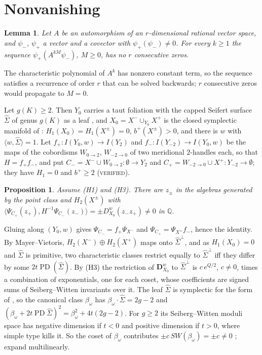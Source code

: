 \documentclass[10pt]{amsart}
\makeatletter
\numberwithin{equation}{section}
\theoremstyle{compact}
\newtheorem{proposition}[theorem]{Proposition}
\newtheorem{lemma}[theorem]{Lemma}
\renewenvironment{proof}[1][\proofname]{\par\pushQED{\qed}\normalfont
  \topsep4\p@\relax\trivlist\item[\hskip\labelsep\itshape#1\@addpunct{.}]%
  \ignorespaces}{\popQED\endtrivlist\@endpefalse}
\newcommand{\Q}{\mathbb Q}
\newcommand{\PD}{\operatorname{PD}}
\newcommand{\hS}{\hat\Sigma}
\newcommand{\ver}{\textsc{verified}}
\makeatother
\begin{document}
\section{Nonvanishing}

\begin{lemma}\label{lem:CH}
Let $A$ be an automorphism of an $r$-dimensional rational vector space, and
$\psi_-$, $\psi_+$ a vector and a covector with $\psi_+(\psi_-)\ne0$. For every
$k\ge1$ the sequence $\psi_+(A^{kM}\psi_-)$, $M\ge0$, has no $r$ consecutive
zeros.
\end{lemma}

\begin{proof}
The characteristic polynomial of $A^k$ has nonzero constant term, so the
sequence satisfies a recurrence of order $r$ that can be solved backwards; $r$
consecutive zeros would propagate to $M=0$.
\end{proof}

Let $g(K)\ge2$. Then $Y_0$ carries a taut foliation with the capped Seifert
surface $\hS$ of genus $g(K)$ as a leaf \cite{Ga}, and $X_0=X^-\cup_{Y_0}X^+$ is the closed
symplectic manifold of \cite[Prop.~15]{KM04}: $H_1(X_0)=H_1(X^\pm)=0$,
$b^+(X^\pm)>0$, and there is $w$ with $\langle w,\hS\rangle=1$. Let
$f_+\colon I(Y_0,w)\to I(Y_2)$ and $f_-\colon I(Y_{-2})\to I(Y_0,w)$ be the maps
of the cobordisms $W_{0\to2}$, $W_{-2\to0}$ of two meridional $2$-handles each,
so that $H=f_+f_-$, and put $C_-=X^-\cup W_{0\to2}\colon\emptyset\to Y_2$ and
$C_+=W_{-2\to0}\cup X^+\colon Y_{-2}\to\emptyset$; they have $H_1=0$ and
$b^+\ge2$ (\ver).

\begin{proposition}\label{prop:caps}
Assume \textup{(H1)} and \textup{(H3)}. There are $z_\pm$ in the algebras
generated by the point class and $H_2(X^\pm)$ with
$\langle\Psi_{C_+}(z_+),H^{-1}\Psi_{C_-}(z_-)\rangle=\pm D^w_{X_0}(z_-z_+)\ne0$ in
$\Q$.
\end{proposition}

\begin{proof}
Gluing along $(Y_0,w)$ gives $\Psi_{C_-}=f_+\Psi_{X^-}$ and
$\Psi_{C_+}=\Psi_{X^+}f_-$, hence the identity. By Mayer--Vietoris, $H_2(X^-)\oplus
H_2(X^+)$ maps onto $\hS^\perp$, and as $H_1(X_0)=0$ and $\hS$ is primitive,
two characteristic classes restrict equally to $\hS^\perp$ iff they differ by
some $2t\PD(\hS)$. By (H3) the restriction of $\mathbf D^w_{X_0}$ to $\hS^\perp$ is
$c\,e^{Q/2}$, $c\ne0$, times a combination of exponentials, one for each coset,
whose coefficients are signed sums of Seiberg--Witten invariants over it. The leaf $\hS$ is symplectic for the form of
\cite[Prop.~15]{KM04}, so the canonical class $\beta_\omega$ has
$\beta_\omega\cdot\hS=2g-2$ and
$(\beta_\omega+2t\PD\hS)^2=\beta_\omega^2+4t(2g-2)$. For $g\ge2$ its
Seiberg--Witten moduli space has negative dimension if $t<0$ and positive
dimension if $t>0$, where simple type kills it. So the coset of $\beta_\omega$
contributes $\pm c\,SW(\beta_\omega)=\pm c\ne0$ \cite{T2}; expand multilinearly.
\end{proof}
\end{document}

